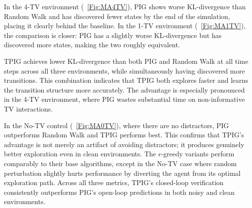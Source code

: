 \documentclass[letterpaper]{article} %
\begin{document}
In the 4-TV environment (\figurename~\ref{Fig:MA4TV}), PIG shows
worse KL-divergence than Random Walk and has discovered fewer states
by the end of the simulation, placing it clearly behind the baseline.
In the 1-TV environment (\figurename~\ref{Fig:MA1TV}), the comparison
is closer: PIG has a slightly worse KL-divergence but has discovered
more states, making the two roughly equivalent.

TPIG achieves lower KL-divergence than both PIG and Random Walk at
all time steps across all three environments, while simultaneously
having discovered more transitions.  This combination indicates that
TPIG both explores faster and learns the transition structure more
accurately.  The advantage is especially pronounced in the 4-TV
environment, where PIG wastes substantial time on non-informative TV
interactions.

In the No-TV control (\figurename~\ref{Fig:MA0TV}), where there are
no distractors, PIG outperforms Random Walk and TPIG performs best.
This confirms that TPIG's advantage is not merely an artifact of
avoiding distractors; it produces genuinely better exploration even
in clean environments.  The $\epsilon$-greedy variants perform
comparably to their base algorithms, except in the No-TV case where
random perturbation slightly hurts performance by diverting the agent
from its optimal exploration path.
Across all three metrics, TPIG's closed-loop verification
consistently outperforms PIG's open-loop predictions in both noisy
and clean environments.
\end{document}
